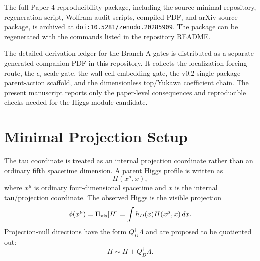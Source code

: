 \documentclass[11pt]{article}
\begin{document}
The full Paper 4 reproducibility package, including the source-minimal repository, regeneration script, Wolfram audit scripts, compiled PDF, and arXiv source package, is archived at \href{https://doi.org/10.5281/zenodo.20285909}{\nolinkurl{doi:10.5281/zenodo.20285909}}. The package can be regenerated with the commands listed in the repository README.

The detailed derivation ledger for the Branch A gates is distributed as a
separate generated companion PDF in this repository.  It collects the
localization-forcing route, the $\epsilon_\tau$ scale gate, the wall-cell
embedding gate, the v0.2 single-package parent-action scaffold, and the
dimensionless top/Yukawa coefficient chain.  The present manuscript reports
only the paper-level consequences and reproducible checks needed for the
Higgs-module candidate.

\section{Minimal Projection Setup}
The tau coordinate is treated as an internal projection coordinate rather than an ordinary fifth spacetime dimension. A parent Higgs profile is written as
\begin{equation}
H(x^\mu,x),
\end{equation}
where $x^\mu$ is ordinary four-dimensional spacetime and $x$ is the internal tau/projection coordinate. The observed Higgs is the visible projection
\begin{equation}
\phi(x^\mu)=\Pi_{\rm vis}[H]=\int h_D(x)H(x^\mu,x)\,dx .
\end{equation}
Projection-null directions have the form $Q_D^\dagger\Lambda$ and are proposed to be quotiented out:
\begin{equation}
H\sim H+Q_D^\dagger\Lambda .
\end{equation}
\end{document}
